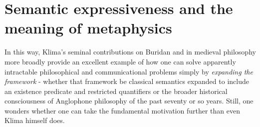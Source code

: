\documentclass[]{article}
\begin{document}








\section{Semantic expressiveness and the meaning of metaphysics}
In this way, 
Klima's seminal contributions on Buridan and in medieval philosophy more broadly provide an excellent example of how one can solve apparently intractable philosophical and communicational problems 
simply by \emph{expanding the framework}
 - whether that framework be classical semantics expanded to include an existence predicate and restricted quantifiers
 or the broader historical consciousness of Anglophone philosophy of the past seventy or so years. 
Still, one wonders whether one can take the fundamental motivation further than even Klima himself does. 
\end{document}
